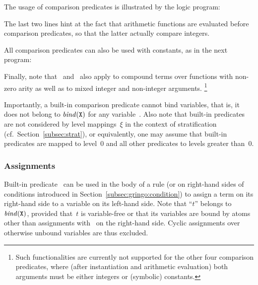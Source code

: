 \begin{example}\label{ex:arith:pred}
The usage of comparison predicates is illustrated by the logic program:%
%

%
The last two lines hint at the fact that arithmetic functions are evaluated
before comparison predicates, so that the latter actually compare integers.

All comparison predicates can also be used with constants,
as in the next program:%
%

%
Finally, note that~\code{==} and~\code{!=} also apply to
compound terms over functions with non-zero arity as well as to
mixed integer and non-integer arguments.%
\footnote{%
  Such functionalities are currently not supported for the other four
  comparison predicates,
  where (after instantiation and arithmetic evaluation)
  both arguments must be either integers or (symbolic) constants.
}
\eexample
\end{example}

Importantly, a built-in comparison predicate cannot bind variables,
that is, it does not belong to $\binders{\var{X}}{r}$ for any variable~.
Also note that built-in predicates are not considered by level mappings~$\xi$
in the context of stratification (cf.\ Section~\ref{subsec:strat}), or equivalently,
one may assume that built-in predicates are mapped to level~$0$ and all other
predicates to levels greater than~$0$.


\subsubsection{Assignments}\label{subsec:gringo:assign}

Built-in predicate~\code{=} can be used in the body of a rule
(or on right-hand sides of conditions introduced in Section~\ref{subsec:gringo:condition})
to assign a term on its right-hand side to a variable on its left-hand side.
Note that ``$t$'' belongs to~$\binders{\var{X}}{r}$,
provided that~$t$ is variable-free or that its variables are bound
by atoms other than assignments with~ on the right-hand side.
Cyclic assignments over otherwise unbound variables are thus excluded.

